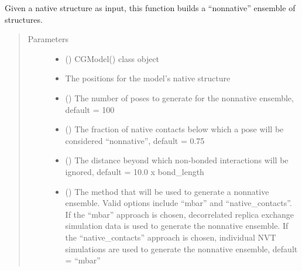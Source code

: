 \documentclass[letterpaper,12pt,english,openany,oneside]{sphinxmanual}
\begin{document}
\begin{fulllineitems}
\label{\detokenize{ensembles:ensembles.ens_build.get_nonnative_ensemble}}
Given a native structure as input, this function builds a “nonnative” ensemble of structures.
\begin{quote}\begin{description}
\item[{Parameters}] \leavevmode\begin{itemize}
\item {} 
 () \textendash{} CGModel() class object

\item {} 
 \textendash{} The positions for the model’s native structure

\item {} 
 () \textendash{} The number of poses to generate for the nonnative ensemble, default = 100

\item {} 
 () \textendash{} The fraction of native contacts below which a pose will be considered “nonnative”, default = 0.75

\item {} 
 () \textendash{} The distance beyond which non-bonded interactions will be ignored, default = 10.0 x bond\_length

\item {} 
 () \textendash{} The method that will be used to generate a nonnative ensemble.  Valid options include “mbar” and “native\_contacts”.  If the “mbar” approach is chosen, decorrelated replica exchange simulation data is used to generate the nonnative ensemble.  If the “native\_contacts” approach is chosen, individual NVT simulations are used to generate the nonnative ensemble, default = “mbar”


\end{itemize}
\end{description}
\end{quote}
\end{fulllineitems}
\end{document}
